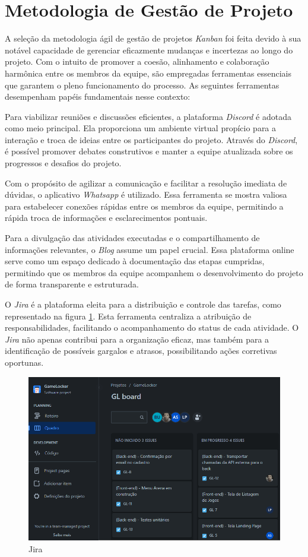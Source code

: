 \section{Metodologia de Gestão de Projeto}

A seleção da metodologia ágil de gestão de projetos \textit{\gls{Kanban}} foi feita devido à sua notável capacidade de gerenciar eficazmente mudanças e incertezas ao longo do projeto. Com o intuito de promover a coesão, alinhamento e colaboração harmônica entre os membros da equipe, são empregadas ferramentas essenciais que garantem o pleno funcionamento do processo. As seguintes ferramentas desempenham papéis fundamentais nesse contexto:

Para viabilizar reuniões e discussões eficientes, a plataforma \textit{\gls{Discord}} é adotada como meio principal. Ela proporciona um ambiente virtual propício para a interação e troca de ideias entre os participantes do projeto. Através do \textit{\gls{Discord}}, é possível promover debates construtivos e manter a equipe atualizada sobre os progressos e desafios do projeto.

Com o propósito de agilizar a comunicação e facilitar a resolução imediata de dúvidas, o aplicativo \textit{\gls{Whatsapp}} é utilizado. Essa ferramenta se mostra valiosa para estabelecer conexões rápidas entre os membros da equipe, permitindo a rápida troca de informações e esclarecimentos pontuais.

Para a divulgação das atividades executadas e o compartilhamento de informações relevantes, o \textit{\gls{Blog}} assume um papel crucial. Essa plataforma online serve como um espaço dedicado à documentação das etapas cumpridas, permitindo que os membros da equipe acompanhem o desenvolvimento do projeto de forma transparente e estruturada.

O \textit{\gls{Jira}} é a plataforma eleita para a distribuição e controle das tarefas, como representado na figura \ref{Jira}. Esta ferramenta centraliza a atribuição de responsabilidades, facilitando o acompanhamento do status de cada atividade. O \textit{\gls{Jira}} não apenas contribui para a organização eficaz, mas também para a identificação de possíveis gargalos e atrasos, possibilitando ações corretivas oportunas.

\begin{figure}[H]
	\centering
	\includegraphics[scale=0.6]{imagens/planejamentoGerenciamento/jira.png}
	\caption{Jira}
	\label{Jira}
\end{figure}

